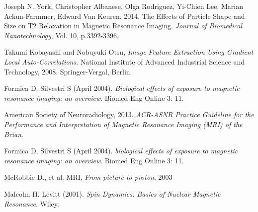 \documentclass[a4paper,12pt]{article}
\begin{document}
\begin{thebibliography}{9}






Joseph N. York, Christopher Albanese, Olga Rodriguez, Yi-Chien Lee, Marian Ackun-Farmmer, Edward Van Keuren. 2014, The Effects of Particle Shape and Size on T2 Relaxation in Magnetic Resonance Imaging. {\em Journal of Biomedical Nanotechnology}, Vol. 10, p.3392-3396.

Takumi Kobayashi and Nobuyuki Otsu, {\em Image Feature Extraction Using Gradient Local Auto-Correlations}. National Institute of Advanced Industrial Science and Technology, 2008. Springer-Vergal, Berlin.

Formica D, Silvestri S (April 2004). {\em Biological effects of exposure to magnetic resonance imaging: an overview}. Biomed Eng Online 3: 11. 

American Society of Neuroradiology, 2013. {\em ACR-ASNR Practice Guideline for the Performance and Interpretation of Magnetic Resonance Imaging (MRI) of the Brian}.

Formica D, Silvestri S (April 2004). {\em biological effects of exposure to magnetic resonance imaging: an overview}. Biomed Eng Online 3: 11. 

McRobbie D., et al. MRI, {\em From picture to proton}. 2003

Malcolm H. Levitt (2001). {\em Spin Dynamics: Basics of Nuclear Magnetic Resonance}. Wiley.

\end{thebibliography}
\end{document}
